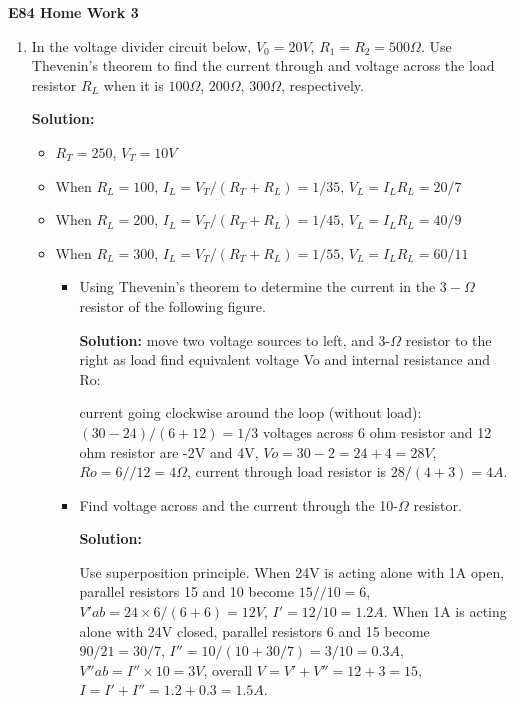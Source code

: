 \usepackage{html}

\begin{center}
{\Large \bf E84 Home Work 3}
\end{center}
\begin{enumerate}

\begin{enumerate}

\item In the voltage divider circuit below, $V_0=20V$, $R_1=R_2=500\Omega$. 
Use Thevenin's theorem to find the current through and voltage across the 
load resistor $R_L$ when it is $100\Omega$, $200\Omega$, $300\Omega$, 
respectively.


{\bf Solution:}
\begin{itemize}
\item $R_T=250$, $V_T=10V$
\item When $R_L=100$, $I_L=V_T/(R_T+R_L)=1/35$, $V_L=I_L R_L=20/7$
\item When $R_L=200$, $I_L=V_T/(R_T+R_L)=1/45$, $V_L=I_L R_L=40/9$
\item When $R_L=300$, $I_L=V_T/(R_T+R_L)=1/55$, $V_L=I_L R_L=60/11$
\begin{itemize}

\item Using Thevenin's theorem to determine the current in the $3-\Omega$ 
resistor of the following figure.


{\bf Solution:}
move two voltage sources to left, and 3-$\Omega$ resistor to the right as load
find equivalent voltage Vo and internal resistance and Ro:

current going clockwise around the loop (without load): $(30-24)/(6+12)=1/3$
voltages across 6 ohm resistor and 12 ohm resistor are -2V and 4V, 
$Vo=30-2=24+4=28V$, $Ro=6//12=4\Omega$, current through load resistor is 
$28/(4+3)=4A$.

\item Find voltage across and the current through the 10-$\Omega$ resistor.


{\bf Solution:}

Use superposition principle. When 24V is acting alone with 1A open, 
parallel resistors 15 and 10 become $15//10=6$, $V'ab=24 \times 6/(6+6)=12V$,
$I'=12/10=1.2A$. When 1A is acting alone with 24V closed, parallel resistors
6 and 15 become $90/21=30/7$, $I''=10/(10+30/7)=3/10=0.3 A$, 
$V''ab=I'' \times 10=3V$, overall $V=V'+V''=12+3=15$, $I=I'+I''=1.2+0.3=1.5A$.


\end{itemize}
\end{itemize}
\end{enumerate}
\end{enumerate}
